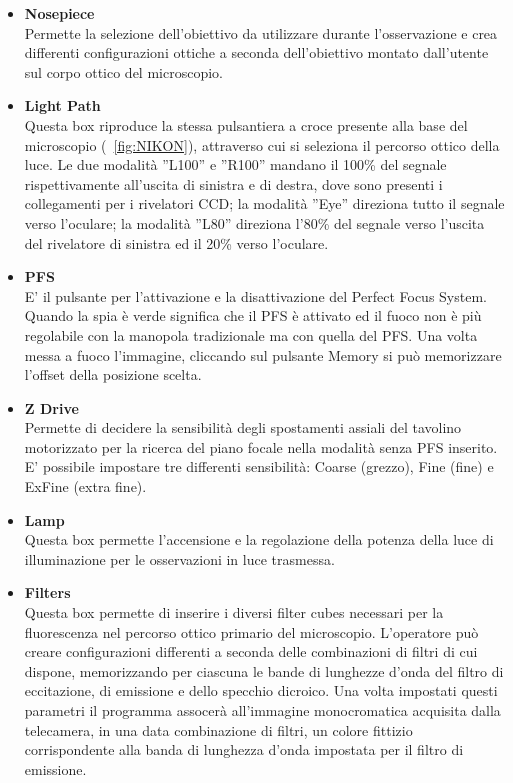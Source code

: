 \begin{itemize}

\item \textbf{Nosepiece}\\
Permette la selezione dell'obiettivo da utilizzare durante l'osservazione e crea differenti configurazioni ottiche a seconda dell'obiettivo montato dall'utente sul corpo ottico del microscopio.
\item \textbf{Light Path}\\
Questa box riproduce la stessa pulsantiera a croce presente alla base del microscopio (\figurename~\ref{fig:NIKON}), attraverso cui si seleziona il percorso ottico della luce. Le due modalità ''L100'' e ''R100'' mandano il 100\% del segnale rispettivamente all'uscita di sinistra e di destra, dove sono presenti i collegamenti per i rivelatori CCD; la modalità ''Eye'' direziona tutto il segnale verso l'oculare; la modalità ''L80'' direziona l'80\% del segnale verso l'uscita del rivelatore di sinistra ed il 20\% verso l'oculare.
\item \textbf{PFS}\\
E' il pulsante per l'attivazione e la disattivazione del Perfect Focus System. Quando la spia è verde significa che il PFS è attivato ed il fuoco non è più regolabile con la manopola tradizionale ma con quella del PFS. Una volta messa a fuoco l'immagine, cliccando sul pulsante Memory si può memorizzare l'offset della posizione scelta.
\item \textbf{Z Drive}\\
Permette di decidere la sensibilità degli spostamenti assiali del tavolino motorizzato per la ricerca del piano focale nella modalità senza PFS inserito. E' possibile impostare tre differenti sensibilità: Coarse (grezzo), Fine (fine) e ExFine (extra fine).
\item \textbf{Lamp}\\
Questa box permette l'accensione e la regolazione della potenza della luce di illuminazione per le osservazioni in luce trasmessa.
\item \textbf{Filters}\\
Questa box permette di inserire i diversi filter cubes necessari per la fluorescenza nel percorso ottico primario del microscopio. L'operatore può creare configurazioni differenti a seconda delle combinazioni di filtri di cui dispone, memorizzando per ciascuna le bande di lunghezze d'onda del filtro di eccitazione, di emissione e dello specchio dicroico. Una volta impostati questi parametri il programma assocerà all'immagine monocromatica acquisita dalla telecamera, in una data combinazione di filtri, un colore fittizio corrispondente alla banda di lunghezza d'onda impostata per il filtro di emissione.

\end{itemize}

